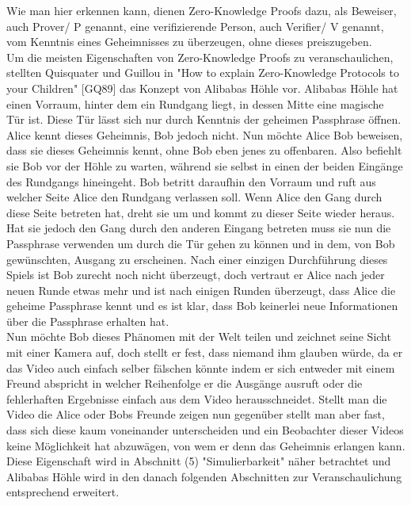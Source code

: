 \documentclass {article}
\begin{document}
Wie man hier erkennen kann, dienen Zero-Knowledge Proofs dazu, als Beweiser, auch Prover/ P genannt, eine
verifizierende Person, auch Verifier/ V genannt, vom Kenntnis eines Geheimnisses zu überzeugen, ohne dieses preiszugeben. \\ 

Um die meisten Eigenschaften von Zero-Knowledge Proofs zu veranschaulichen, stellten Quisquater und Guillou in "How to explain Zero-Knowledge Protocols to your Children" [GQ89] das Konzept von Alibabas H\"ohle vor. Alibabas H\"ohle hat einen Vorraum, hinter dem ein Rundgang liegt, in dessen Mitte eine magische T\"ur ist. Diese T\"ur l\"asst sich nur durch Kenntnis der geheimen Passphrase \"offnen. Alice kennt dieses Geheimnis, Bob jedoch nicht. Nun m\"ochte Alice Bob beweisen, dass sie dieses Geheimnis kennt, ohne Bob eben jenes zu offenbaren. Also befiehlt sie Bob vor der H\"ohle zu warten, w\"ahrend sie selbst in einen der beiden Eing\"ange des Rundgangs hineingeht. Bob betritt daraufhin den Vorraum und ruft aus welcher Seite Alice den Rundgang verlassen soll. Wenn Alice den Gang durch diese Seite betreten hat, dreht sie um und kommt zu dieser Seite wieder heraus. Hat sie jedoch den Gang durch den anderen Eingang betreten muss sie nun die Passphrase verwenden um durch die T\"ur gehen zu k\"onnen und in dem, von Bob gewünschten, Ausgang zu erscheinen. Nach einer einzigen Durchf\"uhrung dieses Spiels ist Bob zurecht noch nicht \"uberzeugt, doch vertraut er Alice nach jeder neuen Runde etwas mehr und ist nach einigen Runden \"uberzeugt, dass Alice die geheime Passphrase kennt und es ist klar, dass Bob keinerlei neue Informationen \"uber die Passphrase erhalten hat. \\  Nun m\"ochte Bob dieses Ph\"anomen mit der Welt teilen und zeichnet seine Sicht mit einer Kamera auf, doch stellt er fest, dass niemand ihm glauben würde, da er das Video auch einfach selber f\"alschen k\"onnte indem er sich entweder mit einem Freund abspricht in welcher Reihenfolge er die Ausg\"ange ausruft oder die fehlerhaften Ergebnisse einfach aus dem Video herausschneidet. 
Stellt man die Video die Alice oder Bobs Freunde zeigen nun gegen\"uber stellt man aber fast, dass sich diese kaum voneinander unterscheiden und ein Beobachter dieser Videos keine M\"oglichkeit hat abzuw\"agen, von wem er denn das Geheimnis erlangen kann.
Diese Eigenschaft wird in Abschnitt (5) "Simulierbarkeit" n\"aher betrachtet und Alibabas H\"ohle wird in den danach folgenden Abschnitten zur Veranschaulichung entsprechend erweitert.
\end{document}
